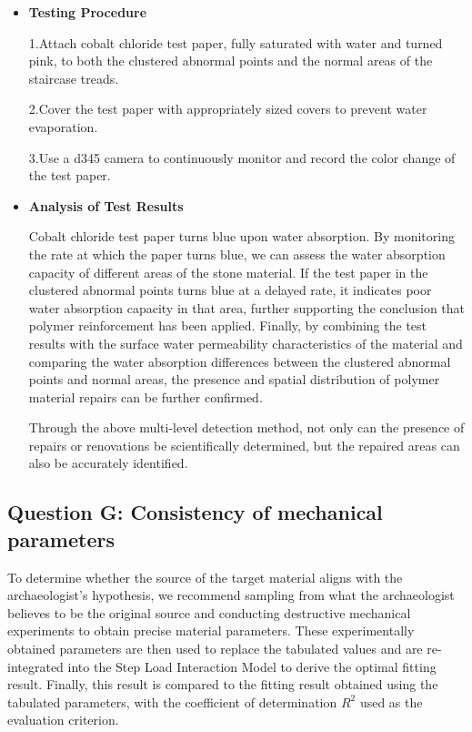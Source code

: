 \documentclass{mcmthesis}
\begin{document}
\begin{itemize}[label=$\diamond$]
\item \textbf{Testing Procedure}

1.Attach cobalt chloride test paper, fully saturated with water and turned pink, to both the clustered abnormal points and the normal areas of the staircase treads.

2.Cover the test paper with appropriately sized covers to prevent water evaporation.

3.Use a d345 camera to continuously monitor and record the color change of the test paper.


\item \textbf{Analysis of Test Results}


Cobalt chloride test paper turns blue upon water absorption. By monitoring the rate at which the paper turns blue, we can assess the water absorption capacity of different areas of the stone material.
If the test paper in the clustered abnormal points turns blue at a delayed rate, it indicates poor water absorption capacity in that area, further supporting the conclusion that polymer reinforcement has been applied.
Finally, by combining the test results with the surface water permeability characteristics of the material and comparing the water absorption differences 
between the clustered abnormal points and normal areas, the presence and spatial distribution of polymer material repairs can be further confirmed.

Through the above multi-level detection method, not only can the presence of repairs or renovations be scientifically determined, but the repaired areas can also be accurately identified.
\end{itemize}
\subsection{Question G: Consistency of mechanical parameters}

To determine whether the source of the target material aligns with the archaeologist's hypothesis, we recommend sampling from what the archaeologist believes to be the original source and conducting destructive mechanical experiments to obtain precise material parameters. These experimentally obtained parameters are then used to replace the tabulated values and are re-integrated into the Step Load Interaction Model to derive the optimal fitting result. Finally, this result is compared to the fitting result obtained using the tabulated parameters, with the coefficient of determination $R^2$ used as the evaluation criterion.
\end{document}
